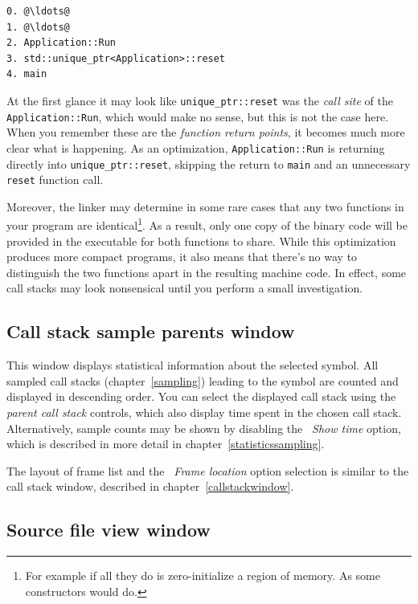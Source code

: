 \documentclass[hidelinks,titlepage,a4paper]{article}
\begin{document}
\begin{lstlisting}
0. @\ldots@
1. @\ldots@
2. Application::Run
3. std::unique_ptr<Application>::reset
4. main
\end{lstlisting}

At the first glance it may look like \texttt{unique\_ptr::reset} was the \emph{call site} of the \texttt{Application::Run}, which would make no sense, but this is not the case here. When you remember these are the \emph{function return points}, it becomes much more clear what is happening. As an optimization, \texttt{Application::Run} is returning directly into \texttt{unique\_ptr::reset}, skipping the return to \texttt{main} and an unnecessary \texttt{reset} function call.

Moreover, the linker may determine in some rare cases that any two functions in your program are identical\footnote{For example if all they do is zero-initialize a region of memory. As some constructors would do.}. As a result, only one copy of the binary code will be provided in the executable for both functions to share. While this optimization produces more compact programs, it also means that there's no way to distinguish the two functions apart in the resulting machine code. In effect, some call stacks may look nonsensical until you perform a small investigation.

\subsection{Call stack sample parents window}
\label{sampleparents}

This window displays statistical information about the selected symbol. All sampled call stacks (chapter~\ref{sampling}) leading to the symbol are counted and displayed in descending order. You can select the displayed call stack using the \emph{parent call stack} controls, which also display time spent in the chosen call stack. Alternatively, sample counts may be shown by disabling the \emph{\faStopwatch{}~Show time} option, which is described in more detail in chapter~\ref{statisticssampling}.

The layout of frame list and the \emph{\faAt{}~Frame location} option selection is similar to the call stack window, described in chapter~\ref{callstackwindow}.

\subsection{Source file view window}
\label{sourceview}
\end{document}
